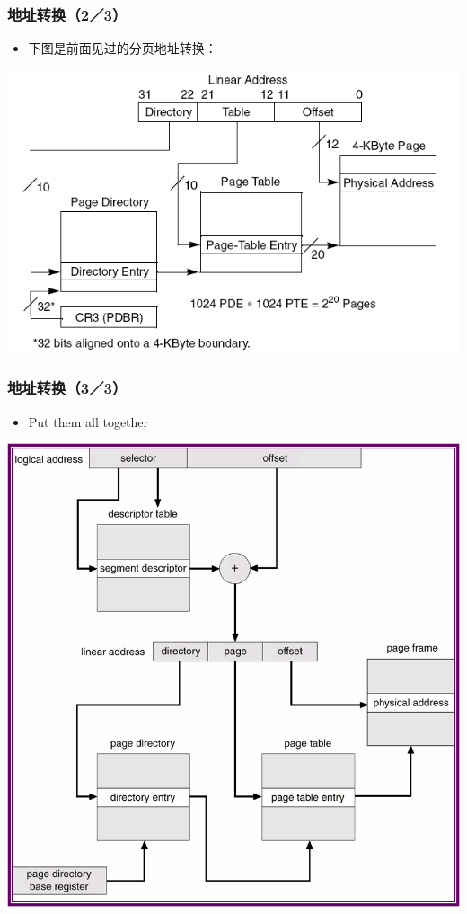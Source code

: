 \documentclass[CJKutf8,xcolor=pdftex,dvipsnames,table]{beamer}
\begin{document}
\begin{CJK*}{UTF8}{song}
  \begin{frame}
  \frametitle{地址转换（2／3）} \pause
  \begin{itemize}
  \item{下图是前面见过的分页地址转换：} \pause
  \end{itemize}
  \begin{center}
    \includegraphics[scale=.5]{x86atl2p}
  \end{center}
  \end{frame}
  
  \begin{frame}
  \frametitle{地址转换（3／3）} \pause
  \begin{itemize}
  \item{Put them all together} \pause
  \end{itemize}
  \begin{center}
    \includegraphics[scale=.5]{v6f9-21}
  \end{center}
  \end{frame}


\end{CJK*}
\end{document}
